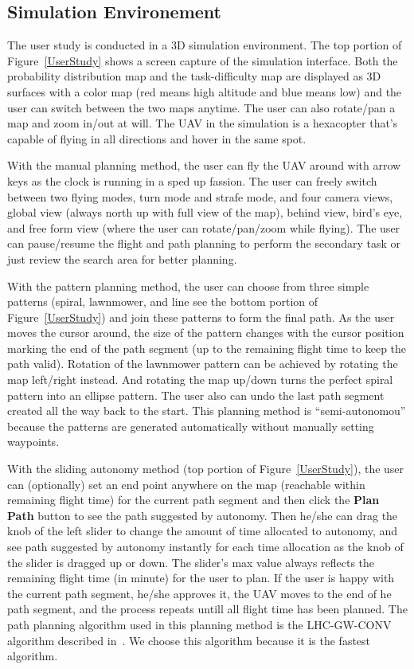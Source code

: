 \documentclass[journal]{IEEEtran}
\begin{document}
\subsection{Simulation Environement}

The user study is conducted in a 3D simulation environment. The top portion of Figure~\ref{UserStudy} shows a screen capture of the simulation interface. Both the probability distribution map and the task-difficulty map are displayed as 3D surfaces with a color map (red means high altitude and blue means low) and the user can switch between the two maps anytime. The user can also rotate/pan a map and zoom in/out at will. The UAV in the simulation is a hexacopter that's capable of flying in all directions and hover in the same spot.

With the manual planning method, the user can fly the UAV around with arrow keys as the clock is running in a sped up fassion. The user can freely switch between two flying modes, turn mode and strafe mode, and four camera views, global view (always north up with full view of the map), behind view, bird's eye, and free form view (where the user can rotate/pan/zoom while flying). The user can pause/resume the flight and path planning to perform the secondary task or just review the search area for better planning.

With the pattern planning method, the user can choose from three simple patterns (spiral, lawnmower, and line see the bottom portion of Figure~\ref{UserStudy}) and join these patterns to form the final path. As the user moves the cursor around, the size of the pattern changes with the cursor position marking the end of the path segment (up to the remaining flight time to keep the path valid). Rotation of the lawnmower pattern can be achieved by rotating the map left/right instead. And rotating the map up/down turns the perfect spiral pattern into an ellipse pattern. The user also can undo the last path segment created all the way back to the start. This planning method is ``semi-autonomou'' because the patterns are generated automatically without manually setting waypoints.

With the sliding autonomy method (top portion of Figure~\ref{UserStudy}), the user can (optionally) set an end point anywhere on the map (reachable within remaining flight time) for the current path segment and then click the \textbf{Plan Path} button to see the path suggested by autonomy. Then he/she can drag the knob of the left slider to change the amount of time allocated to autonomy, and see path suggested by autonomy instantly for each time allocation as the knob of the slider is dragged up or down. The slider's max value always reflects the remaining flight time (in minute) for the user to plan. If the user is happy with the current path segment, he/she approves it, the UAV moves to the end of he path segment, and the process repeats untill all flight time has been planned. The path planning algorithm used in this planning method is the LHC-GW-CONV algorithm described in~\cite{Lin2009UAV, Lin2014Hierarchical}. We choose this algorithm because it is the fastest algorithm.
\end{document}
